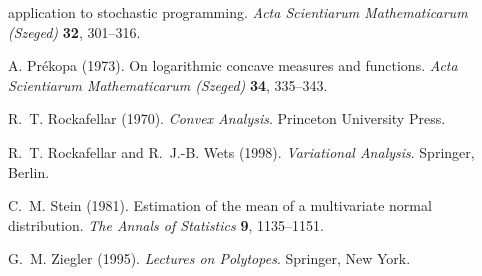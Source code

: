 \documentclass[11pt,letterpaper]{article}
\theoremstyle{plain}
\begin{document}
\begin{description}
application to stochastic programming. \emph{Acta Scientiarum Mathematicarum
(Szeged)} \textbf{32}, 301--316.
\item[{[Pre73]}] A. Pr\'ekopa (1973). On logarithmic concave measures and
functions. \emph{Acta Scientiarum Mathematicarum (Szeged)} \textbf{34},
335--343.
\item[{[Roc70]}] R.~T. Rockafellar (1970). \emph{Convex Analysis}. Princeton
University Press.
\item[{[RW98]}] R.~T. Rockafellar and R.~J.-B. Wets (1998). \emph{Variational
Analysis}. Springer, Berlin.
\item[{[Ste81]}] C.~M. Stein (1981). Estimation of the mean of a multivariate
normal distribution. \emph{The Annals of Statistics} \textbf{9}, 1135--1151.
\item[{[Zie95]}] G.~M. Ziegler (1995). \emph{Lectures on Polytopes}.
Springer, New York.
\end{description}
\end{document}
